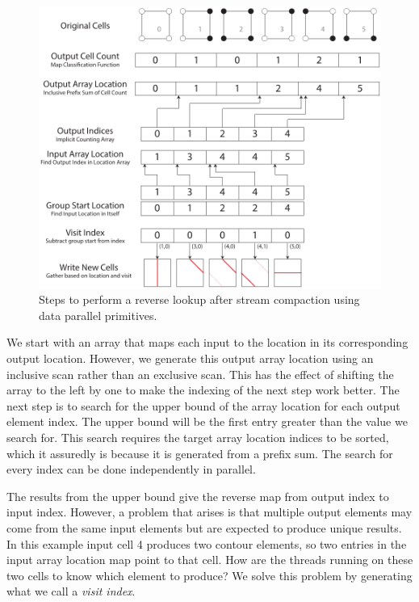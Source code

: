 \documentclass{superfri}
\newcommand*{\keyterm}[1]{\emph{#1}}
\begin{document}
\begin{figure}[htb]
  \centering
  \includegraphics[scale=.9]{images/ReverseLookup}
  \caption{Steps to perform a reverse lookup after stream compaction using
    data parallel primitives.}
  \label{fig:ReverseLookup}
\end{figure}

We start with an array that maps each input to the location in its
corresponding output location. However, we generate this output array
location using an inclusive scan rather than an exclusive scan. This has
the effect of shifting the array to the left by one to make the indexing of
the next step work better. The next step is to search for the upper bound
of the array location for each output element index. The upper bound will
be the first entry greater than the value we search for. This search
requires the target array location indices to be sorted, which it assuredly
is because it is generated from a prefix sum. The search for every index
can be done independently in parallel.

The results from the upper bound give the reverse map from output index
to input index. However, a problem that arises is that multiple output
elements may come from the same input elements but are expected to produce
unique results. In this example input cell 4 produces two contour
elements, so two entries in the input array location map point to that
cell. How are the threads running on these two cells to know which element
to produce? We solve this problem by generating what we call a
\keyterm{visit index}.
\end{document}
